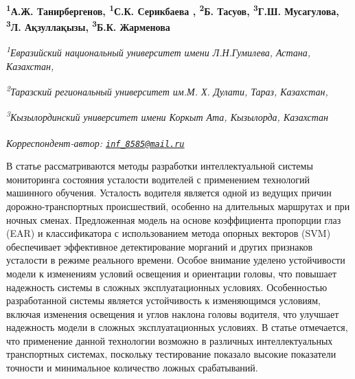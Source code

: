 
\begin{articleheader}

{\bfseries \textsuperscript{1}А.Ж. Танирбергенов,
\textsuperscript{1}С.К. Серикбаева\textsuperscript{\envelope } ,
\textsuperscript{2}Б. Тасуов,
\textsuperscript{3}Г.Ш. Мусагулова,
\textsuperscript{3}Л. Ақзуллақызы,
\textsuperscript{3}Б.К. Жарменова}
\end{articleheader}

\begin{affiliation}
\emph{\textsuperscript{1}Евразийский национальный университет имени Л.Н.Гумилева, Астана, Казахстан,}

\emph{\textsuperscript{2}Таразский региональный университет им.М. Х. Дулати, Тараз, Казахстан,}

\emph{\textsuperscript{3}Кызылординский университет имени Коркыт Ата, Кызылорда, Казахстан}

\raggedright \textsuperscript{\envelope }\emph{Корреспондент-автор: \href{mailto:inf_8585@mail.ru}{\nolinkurl{inf\_8585@mail.ru}}}
\end{affiliation}

В статье рассматриваются методы разработки интеллектуальной системы
мониторинга состояния усталости водителей с применением технологий
машинного обучения. Усталость водителя является одной из ведущих причин
дорожно-транспортных происшествий, особенно на длительных маршрутах и
при ночных сменах. Предложенная модель на основе коэффициента пропорции
глаз (EAR) и классификатора с использованием метода опорных векторов
(SVM) обеспечивает эффективное детектирование морганий и других
признаков усталости в режиме реального времени. Особое внимание уделено
устойчивости модели к изменениям условий освещения и ориентации головы,
что повышает надежность системы в сложных эксплуатационных условиях.
Особенностью разработанной системы является устойчивость к изменяющимся
условиям, включая изменения освещения и углов наклона головы водителя,
что улучшает надежность модели в сложных эксплуатационных условиях. В
статье отмечается, что применение данной технологии возможно в различных
интеллектуальных транспортных системах, поскольку тестирование показало
высокие показатели точности и минимальное количество ложных
срабатываний.

